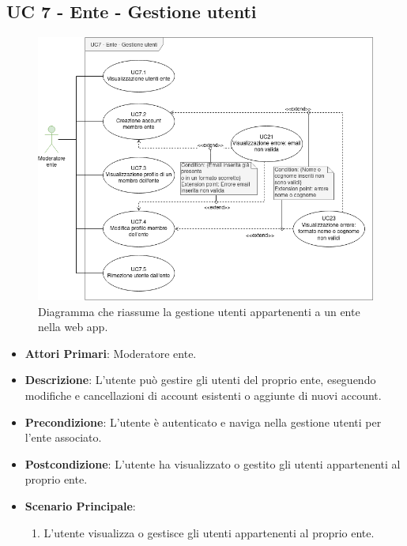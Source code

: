 	\subsection{UC 7 - Ente - Gestione utenti}
		
		\begin{figure}[H]
			\centering
			\includegraphics[scale=0.60]{res/images/uc7}
			\caption{Diagramma che riassume la gestione utenti appartenenti a un ente nella web app.}
		\end{figure}

		\begin{itemize}
			\item \textbf{Attori Primari}: Moderatore ente.
			\item \textbf{Descrizione}: L'utente può gestire gli utenti del proprio ente, eseguendo modifiche e cancellazioni di account esistenti o aggiunte di nuovi account.
			\item \textbf{Precondizione}: L'utente è autenticato e naviga nella gestione utenti per l'ente associato.
			\item \textbf{Postcondizione}: L'utente ha visualizzato o gestito gli utenti appartenenti al proprio ente.
			\item \textbf{Scenario Principale}:
			\begin{enumerate}
				\item{L'utente visualizza o gestisce gli utenti appartenenti al proprio ente.}
			\end{enumerate}	
		\end{itemize}
			
